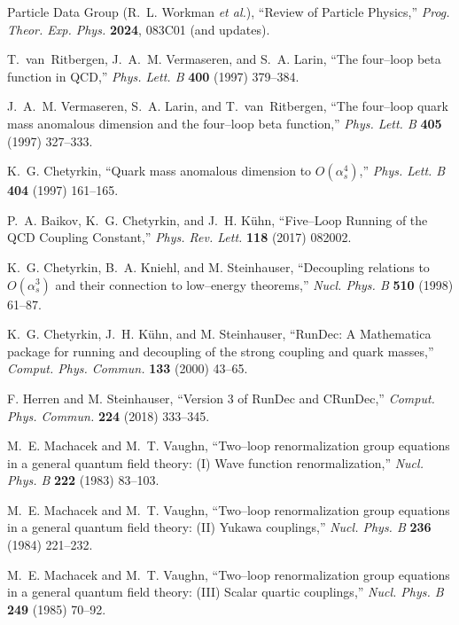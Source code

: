 \documentclass[epjc3]{svjour3}
\begin{document}
\begin{thebibliography}{99}

Particle Data Group (R.~L. Workman \emph{et al.}), ``Review of Particle Physics,'' \emph{Prog. Theor. Exp. Phys.} \textbf{2024}, 083C01 (and updates).

T.~van~Ritbergen, J.~A.~M. Vermaseren, and S.~A. Larin, ``The four–loop beta function in QCD,'' \emph{Phys. Lett. B} \textbf{400} (1997) 379–384.

J.~A.~M. Vermaseren, S.~A. Larin, and T.~van~Ritbergen, ``The four–loop quark mass anomalous dimension and the four–loop beta function,'' \emph{Phys. Lett. B} \textbf{405} (1997) 327–333.

K.~G. Chetyrkin, ``Quark mass anomalous dimension to $O(\alpha_s^4)$,'' \emph{Phys. Lett. B} \textbf{404} (1997) 161–165.

P.~A. Baikov, K.~G. Chetyrkin, and J.~H. Kühn, ``Five–Loop Running of the QCD Coupling Constant,'' \emph{Phys. Rev. Lett.} \textbf{118} (2017) 082002.

K.~G. Chetyrkin, B.~A. Kniehl, and M. Steinhauser, ``Decoupling relations to $O(\alpha_s^3)$ and their connection to low–energy theorems,'' \emph{Nucl. Phys. B} \textbf{510} (1998) 61–87.

K.~G. Chetyrkin, J.~H. Kühn, and M. Steinhauser, ``RunDec: A Mathematica package for running and decoupling of the strong coupling and quark masses,'' \emph{Comput. Phys. Commun.} \textbf{133} (2000) 43–65.

F. Herren and M. Steinhauser, ``Version 3 of RunDec and CRunDec,'' \emph{Comput. Phys. Commun.} \textbf{224} (2018) 333–345.

M.~E. Machacek and M.~T. Vaughn, ``Two–loop renormalization group equations in a general quantum field theory: (I) Wave function renormalization,'' \emph{Nucl. Phys. B} \textbf{222} (1983) 83–103.

M.~E. Machacek and M.~T. Vaughn, ``Two–loop renormalization group equations in a general quantum field theory: (II) Yukawa couplings,'' \emph{Nucl. Phys. B} \textbf{236} (1984) 221–232.

M.~E. Machacek and M.~T. Vaughn, ``Two–loop renormalization group equations in a general quantum field theory: (III) Scalar quartic couplings,'' \emph{Nucl. Phys. B} \textbf{249} (1985) 70–92.


\end{thebibliography}
\end{document}
